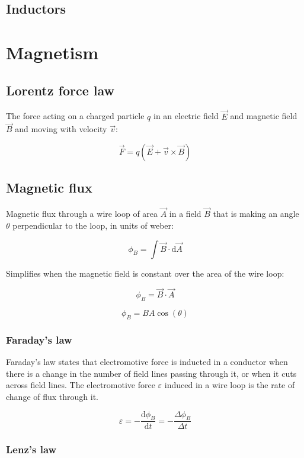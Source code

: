 \documentclass[12pt]{article}
\begin{document}
\subsection{Inductors}

\newpage

\section{Magnetism}

\subsection{Lorentz force law}

The force acting on a charged particle $q$ in an electric field $\vec{E}$ and magnetic field $\vec{B}$ and moving with velocity $\vec{v}$:

\[
\boxed{\vec{F} = q\left(\vec{E} + \vec{v} \times \vec{B}\right)}
\]

\subsection{Magnetic flux}

Magnetic flux through a wire loop of area $\vec{A}$ in a field $\vec{B}$ that is making an angle $\theta$ perpendicular to the loop, in units of weber:

\[
\boxed{
\phi_B = \int \vec{B} \cdot \mathrm{d}\vec{A}
}
\]

Simplifies when the magnetic field is constant over the area of the wire loop:

\[
\boxed{
\phi_B = \vec{B} \cdot \vec{A}
}
\]

\[
\boxed{
\phi_B = BA\cos(\theta)
}
\]

\subsubsection{Faraday's law}

Faraday's law states that electromotive force is inducted in a conductor when there is a change in the number of field lines passing through it, or when it cuts across field lines. The electromotive force $\varepsilon$ induced in a wire loop is the rate of change of flux through it.

\[
\boxed{
\varepsilon = -\frac{\mathrm{d}\phi_B}{\mathrm{d}t} = -\frac{\Delta \phi_B}{\Delta t}
}
\]

\subsubsection{Lenz's law}
\end{document}
